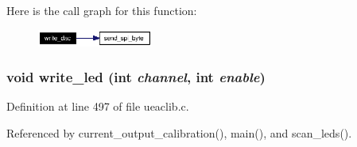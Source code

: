Here is the call graph for this function:\begin{figure}[H]
\begin{center}
\leavevmode
\includegraphics[width=107pt]{ueaclib_8c_a21_cgraph}
\end{center}
\end{figure}
\subsubsection{\setlength{\rightskip}{0pt plus 5cm}void write\_\-led (int {\em channel}, int {\em enable})}\label{ueaclib_8c_a24}




Definition at line 497 of file ueaclib.c.

Referenced by current\_\-output\_\-calibration(), main(), and scan\_\-leds().

